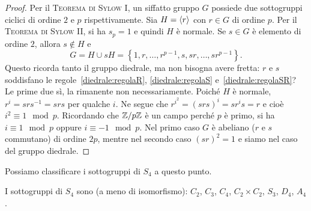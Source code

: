 \begin{proof}
Per il {\scshape Teorema di Sylow I}, un siffatto gruppo $G$ possiede due sottogruppi ciclici di ordine $2$ e $p$ rispettivamente. Sia $H = \left\langle r\right\rangle$ con $r \in G$ di ordine $p$. Per il {\scshape Teorema di Sylow II}, si ha $s_p = 1$ e quindi $H$ è normale. Se $s \in G$ è elemento di ordine $2$, allora $s \notin H$ e
\[G = H \cup sH = \left\{ 1, r, \dots{}, r^{p-1}, s, sr, \dots{}, sr^{p-1} \right\} .\]
Questo ricorda tanto il gruppo diedrale, ma non bisogna avere fretta: $r$ e $s$ soddisfano le regole~\ref{diedrale:regolaR}, \ref{diedrale:regolaS} e~\ref{diedrale:regolaSR}? Le prime due sì, la rimanente non necessariamente. Poiché $H$ è normale, $r^i = srs^{-1} = srs$ per qualche $i$. Ne segue che $r^{i^2} = (srs)^i = s r^i s = r$ e cioè $i^2 \equiv 1 \mod p$. Ricordando che ${\mathbb{Z}}{/}{p\mathbb{Z}}$ è un campo perché $p$ è primo, si ha $i \equiv 1 \mod p$ oppure $i \equiv -1 \mod p$. Nel primo caso $G$ è abeliano ($r$ e $s$ commutano) di ordine $2p$, mentre nel secondo caso $(sr)^2 = 1$ e siamo nel caso del gruppo diedrale.
\end{proof}

\begin{osse}
\end{osse}


Possiamo classificare i sottogruppi di $S_4$ a questo punto.

\begin{prop}[I sottogruppi di $S_4$]
I sottogruppi di $S_4$ sono (a meno di isomorfismo): $C_2$, $C_3$, $C_4$, $C_2 \times C_2$, $S_3$, $D_4$, $A_4$.
\end{prop}

